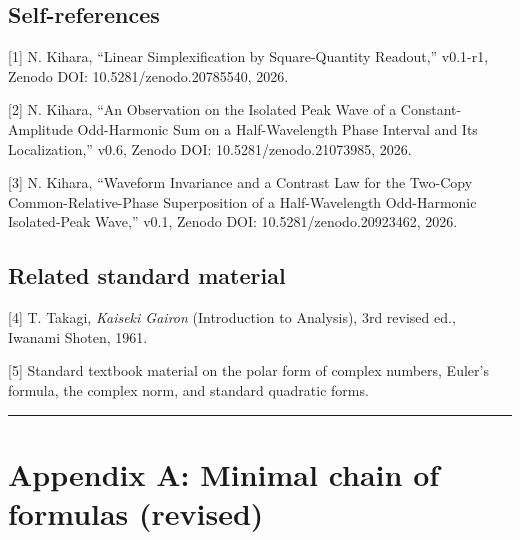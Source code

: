 \documentclass[11pt,a4paper]{article}
\begin{document}
\subsection{Self-references}\label{self-references}

{[}1{]} N. Kihara, ``Linear Simplexification by Square-Quantity
Readout,'' v0.1-r1, Zenodo DOI: 10.5281/zenodo.20785540, 2026.

{[}2{]} N. Kihara, ``An Observation on the Isolated Peak Wave of a
Constant-Amplitude Odd-Harmonic Sum on a Half-Wavelength Phase Interval
and Its Localization,'' v0.6, Zenodo DOI: 10.5281/zenodo.21073985, 2026.

{[}3{]} N. Kihara, ``Waveform Invariance and a Contrast Law for the
Two-Copy Common-Relative-Phase Superposition of a Half-Wavelength
Odd-Harmonic Isolated-Peak Wave,'' v0.1, Zenodo DOI:
10.5281/zenodo.20923462, 2026.

\subsection{Related standard material}\label{related-standard-material}

{[}4{]} T. Takagi, \emph{Kaiseki Gairon} (Introduction to Analysis), 3rd
revised ed., Iwanami Shoten, 1961.

{[}5{]} Standard textbook material on the polar form of complex numbers,
Euler's formula, the complex norm, and standard quadratic forms.

\begin{center}\rule{0.5\linewidth}{0.5pt}\end{center}

\section{Appendix A: Minimal chain of formulas
(revised)}\label{appendix-a-minimal-chain-of-formulas-revised}
\end{document}
